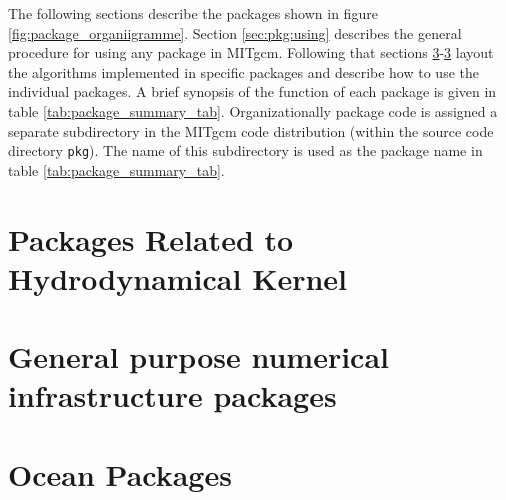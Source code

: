 The following sections describe the packages shown in 
figure \ref{fig:package_organiigramme}. Section \ref{sec:pkg:using}
describes the general procedure for using any package in MITgcm.
Following that sections \ref{}-\ref{} 
layout the algorithms implemented in specific packages
and describe how to use the individual packages. A brief synopsis of the 
function of each package is given in table \ref{tab:package_summary_tab}.
Organizationally package code is assigned a
separate subdirectory in the MITgcm code distribution
(within the source code directory \texttt{pkg}).
The name of this subdirectory is used as the package name in
table \ref{tab:package_summary_tab}.


\newpage


\newpage
\section{Packages Related to Hydrodynamical Kernel}


\newpage


\newpage


\newpage


\newpage



\section{General purpose numerical infrastructure packages}

\newpage


\newpage


\newpage


\newpage
\section{Ocean Packages}


